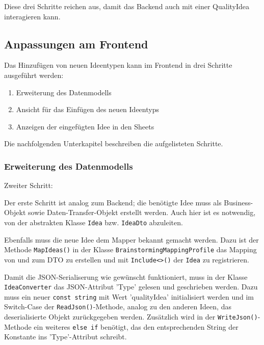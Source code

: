 Diese drei Schritte reichen aus, damit das Backend auch mit einer QualityIdea interagieren kann. 

\subsection{Anpassungen am Frontend}

Das Hinzufügen von neuen Ideentypen kann im Frontend in drei Schritte ausgeführt werden:
\begin{enumerate}
	\item Erweiterung des Datenmodells
	\item Ansicht für das Einfügen des neuen Ideentyps
	\item Anzeigen der eingefügten Idee in den Sheets
\end{enumerate}
Die nachfolgenden Unterkapitel beschreiben die aufgelisteten Schritte.

\subsubsection{Erweiterung des Datenmodells}

\begin{labeling}{Zweiter Schritt:}
	\item[Erster Schritt:] Der erste Schritt ist analog zum Backend; die benötigte Idee muss als Business-Objekt sowie Daten-Transfer-Objekt erstellt werden. Auch hier ist es notwendig, von der abstrakten Klasse \texttt{Idea} bzw. \texttt{IdeaDto} abzuleiten. 
	\item[Zweiter Schritt:] Ebenfalls muss die neue Idee dem Mapper bekannt gemacht werden. Dazu ist der Methode \texttt{MapIdeas()} in der Klasse \texttt{Brainstorming\-Mapping\-Profile} das Mapping von und zum DTO zu erstellen und mit \texttt{Include<>()} der \texttt{Idea} zu registrieren. 
	\item[Dritter Schritt:] Damit die JSON-Serialiserung wie gewünscht funktioniert, muss in der Klasse \texttt{IdeaConverter} das JSON-Attribut 'Type' gelesen und geschrieben werden. Dazu muss ein neuer \texttt{const string} mit Wert 'qualityIdea' initialisiert werden und im Switch-Case der \texttt{ReadJson()}-Methode, analog zu den anderen Ideen, das deserialisierte Objekt zurückgegeben werden. Zusätzlich wird in der \texttt{WriteJson()}-Methode ein weiteres \texttt{else if} benötigt, das den entsprechenden String der Konstante ins 'Type'-Attribut schreibt.
\end{labeling}

